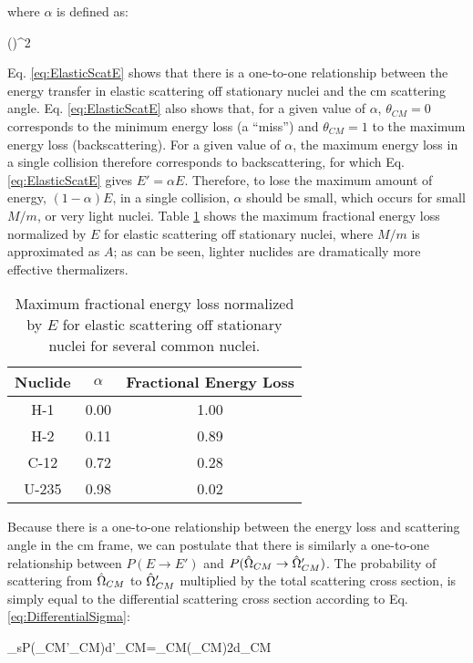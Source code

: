 where \(\alpha\) is defined as:

\beq
\alpha\equiv\left(\right)^2
\eeq

Eq. \eqref{eq:ElasticScatE} shows that there is a one-to-one relationship between the energy transfer in elastic scattering off stationary nuclei and the \gls{cm} scattering angle. Eq. \eqref{eq:ElasticScatE} also shows that, for a given value of \(\alpha\), \(\theta_{CM}=0\) corresponds to the minimum energy loss (a ``miss'') and \(\theta_{CM}=1\) to the maximum energy loss (backscattering). For a given value of \(\alpha\), the maximum energy loss in a single collision therefore corresponds to backscattering, for which Eq. \eqref{eq:ElasticScatE} gives \(E'=\alpha E\). Therefore, to lose the maximum amount of energy, \((1-\alpha)E\), in a single collision, \(\alpha\) should be small, which occurs for small \(M/m\), or very light nuclei. Table \ref{table:FractionalEnergyLoss} shows the maximum fractional energy loss normalized by \(E\) for elastic scattering off stationary nuclei, where \(M/m\) is approximated as \(A\); as can be seen, lighter nuclides are dramatically more effective thermalizers.

\begin{table}[H]
\caption{Maximum fractional energy loss normalized by \(E\) for elastic scattering off stationary nuclei for several common nuclei.}
\centering
\begin{tabular}{c c c}
\hline\hline
Nuclide & \(\alpha\) & Fractional Energy Loss\\ [0.5ex]
\hline
H-1 & 0.00 & 1.00\\
H-2 & 0.11 & 0.89\\
C-12 & 0.72 & 0.28\\
U-235 & 0.98 & 0.02\\
\hline
\end{tabular}
\label{table:FractionalEnergyLoss}
\end{table}

Because there is a one-to-one relationship between the energy loss and scattering angle in the \gls{cm} frame, we can postulate that there is similarly a one-to-one relationship between \(P(E\rightarrow E')\) and \(P(\hat{\Omega}_{CM}\rightarrow\hat{\Omega}_{CM}')\). The probability of scattering from \(\hat{\Omega}_{CM}\) to \(\hat{\Omega}'_{CM}\) multiplied by the total scattering cross section, is simply equal to the differential scattering cross section according to Eq. \eqref{eq:DifferentialSigma}:

\beq
\sigma_sP(\hO_{CM}\rightarrow\hO'_{CM})d\hO'_{CM}=\sigma_{CM}(\theta_{CM})2\pi{}d\theta_{CM}
\eeq

